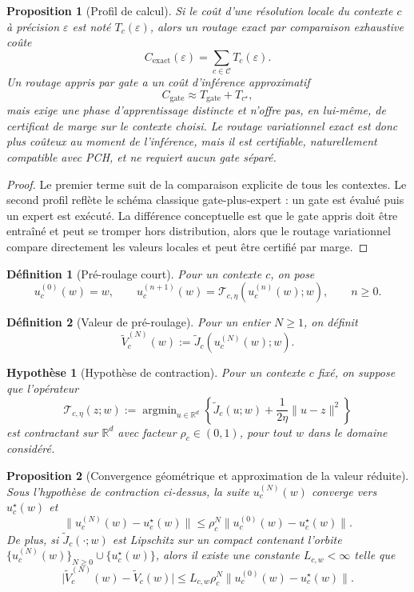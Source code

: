 \documentclass[11pt,a4paper]{article}
\newtheorem{definition}{Définition}[section]
\newtheorem{assumption}{Hypothèse}[section]
\newtheorem{proposition}{Proposition}[section]
\DeclareMathOperator{\argmin}{argmin}
\newcommand{\R}{\mathbb R}
\newcommand{\Ccal}{\mathcal C}
\newcommand{\Tcal}{\mathcal T}
\begin{document}
\begin{proposition}[Profil de calcul]
Si le coût d'une résolution locale du contexte \(c\) à précision \(\varepsilon\) est noté \(T_c(\varepsilon)\), alors un routage exact par comparaison exhaustive coûte
\[
C_{\mathrm{exact}}(\varepsilon)=\sum_{c\in\Ccal} T_c(\varepsilon).
\]
Un routage appris par gate a un coût d'inférence approximatif
\[
C_{\mathrm{gate}}\approx T_{\mathrm{gate}}+T_{c^\star},
\]
mais exige une phase d'apprentissage distincte et n'offre pas, en lui-même, de certificat de marge sur le contexte choisi. Le routage variationnel exact est donc plus coûteux au moment de l'inférence, mais il est certifiable, naturellement compatible avec PCH, et ne requiert aucun gate séparé.
\end{proposition}

\begin{proof}
Le premier terme suit de la comparaison explicite de tous les contextes. Le second profil reflète le schéma classique gate-plus-expert : un gate est évalué puis un expert est exécuté. La différence conceptuelle est que le gate appris doit être entraîné et peut se tromper hors distribution, alors que le routage variationnel compare directement les valeurs locales et peut être certifié par marge.
\end{proof}

\begin{definition}[Pré-roulage court]
Pour un contexte \(c\), on pose
\[
u_c^{(0)}(w)=w,
\qquad
u_c^{(n+1)}(w)=\Tcal_{c,\eta}(u_c^{(n)}(w);w),
\qquad n\ge 0.
\]
\end{definition}

\begin{definition}[Valeur de pré-roulage]
Pour un entier \(N\ge 1\), on définit
\[
\widetilde V_c^{(N)}(w):=\widetilde J_c(u_c^{(N)}(w);w).
\]
\end{definition}

\begin{assumption}[Hypothèse de contraction]
Pour un contexte \(c\) fixé, on suppose que l'opérateur
\[
\Tcal_{c,\eta}(z;w):=\argmin_{u\in\R^d}\left\{\widetilde J_c(u;w)+\frac{1}{2\eta}\|u-z\|^2\right\}
\]
est contractant sur \(\R^d\) avec facteur \(\rho_c\in(0,1)\), pour tout \(w\) dans le domaine considéré.
\end{assumption}

\begin{proposition}[Convergence géométrique et approximation de la valeur réduite]
Sous l'hypothèse de contraction ci-dessus, la suite \(u_c^{(N)}(w)\) converge vers \(u_c^\star(w)\) et
\[
\|u_c^{(N)}(w)-u_c^\star(w)\|\le \rho_c^N\|u_c^{(0)}(w)-u_c^\star(w)\|.
\]
De plus, si \(\widetilde J_c(\cdot;w)\) est Lipschitz sur un compact contenant l'orbite \(\{u_c^{(N)}(w)\}_{N\ge 0}\cup\{u_c^\star(w)\}\), alors il existe une constante \(L_{c,w}<\infty\) telle que
\[
\bigl|\widetilde V_c^{(N)}(w)-\widetilde V_c(w)\bigr|\le L_{c,w}\rho_c^N\|u_c^{(0)}(w)-u_c^\star(w)\|.
\]
\end{proposition}
\end{document}
